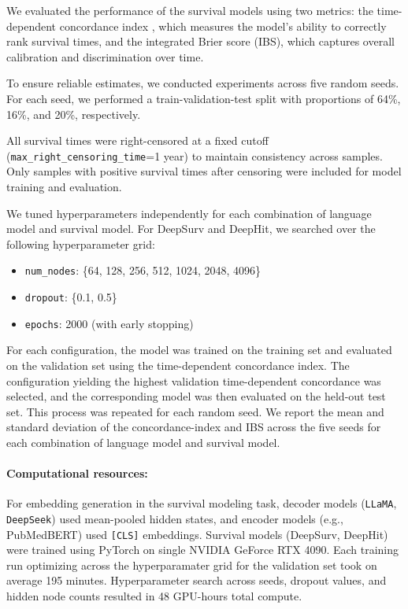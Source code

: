We evaluated the performance of the survival models using two metrics: the time-dependent concordance index \citep{antolini2005time}, which measures the model’s ability to correctly rank survival times, and the integrated Brier score (IBS), which captures overall calibration and discrimination over time. 

To ensure reliable estimates, we conducted experiments across five random seeds.
For each seed, we performed a train-validation-test split with proportions of 64\%, 16\%, and 20\%, respectively. 

All survival times were right-censored at a fixed cutoff (\texttt{max\_right\_censoring\_time}=1 year) to maintain consistency across samples. 
Only samples with positive survival times after censoring were included for model training and evaluation.

We tuned hyperparameters independently for each combination of language model and survival model. 
For DeepSurv and DeepHit, we searched over the following hyperparameter grid:
\begin{itemize}
    \item \texttt{num\_nodes}: \{64, 128, 256, 512, 1024, 2048, 4096\}
    \item \texttt{dropout}: \{0.1, 0.5\}
    \item \texttt{epochs}: 2000 (with early stopping)
\end{itemize}

For each configuration, the model was trained on the training set and evaluated on the validation set using the time-dependent concordance index. 
The configuration yielding the highest validation time-dependent concordance was selected, and the corresponding model was then evaluated on the held-out test set. 
This process was repeated for each random seed.
We report the mean and standard deviation of the concordance-index and IBS across the five seeds for each combination of language model and survival model. 

\paragraph{Computational resources:}
For embedding generation in the survival modeling task, decoder models (\texttt{LLaMA}, \texttt{DeepSeek}) used mean-pooled hidden states, and encoder models (e.g., PubMedBERT) used \texttt{[CLS]} embeddings. Survival models (DeepSurv, DeepHit) were trained using PyTorch on single NVIDIA GeForce RTX 4090. Each training run optimizing across the hyperparamater grid for the validation set took on average 195 minutes. Hyperparameter search across seeds, dropout values, and hidden node counts resulted in 48 GPU-hours total compute.

